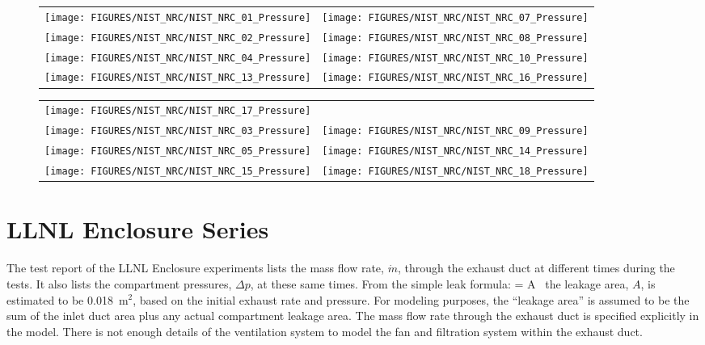 \begin{figure}[p]
\begin{tabular*}{\textwidth}{l@{\extracolsep{\fill}}r}
\texttt{[image: FIGURES/NIST\_NRC/NIST\_NRC\_01\_Pressure]} &
\texttt{[image: FIGURES/NIST\_NRC/NIST\_NRC\_07\_Pressure]} \\
\texttt{[image: FIGURES/NIST\_NRC/NIST\_NRC\_02\_Pressure]} &
\texttt{[image: FIGURES/NIST\_NRC/NIST\_NRC\_08\_Pressure]} \\
\texttt{[image: FIGURES/NIST\_NRC/NIST\_NRC\_04\_Pressure]} &
\texttt{[image: FIGURES/NIST\_NRC/NIST\_NRC\_10\_Pressure]} \\
\texttt{[image: FIGURES/NIST\_NRC/NIST\_NRC\_13\_Pressure]} &
\texttt{[image: FIGURES/NIST\_NRC/NIST\_NRC\_16\_Pressure]}
\end{tabular*}
\label{NIST_NRC_Pressure_Closed}
\end{figure}

\begin{figure}[p]
\begin{tabular*}{\textwidth}{l@{\extracolsep{\fill}}r}
\texttt{[image: FIGURES/NIST\_NRC/NIST\_NRC\_17\_Pressure]} &
   \\
\texttt{[image: FIGURES/NIST\_NRC/NIST\_NRC\_03\_Pressure]} &
\texttt{[image: FIGURES/NIST\_NRC/NIST\_NRC\_09\_Pressure]} \\
\texttt{[image: FIGURES/NIST\_NRC/NIST\_NRC\_05\_Pressure]} &
\texttt{[image: FIGURES/NIST\_NRC/NIST\_NRC\_14\_Pressure]} \\
\texttt{[image: FIGURES/NIST\_NRC/NIST\_NRC\_15\_Pressure]} &
\texttt{[image: FIGURES/NIST\_NRC/NIST\_NRC\_18\_Pressure]}
\end{tabular*}
\label{NIST_NRC_Pressure_Open}
\end{figure}

\clearpage

\section{LLNL Enclosure Series}

The test report of the LLNL Enclosure experiments lists the mass flow rate, $\dot{m}$, through the exhaust duct at different times
during the tests. It also lists the compartment pressures, $\Delta p$, at these same times. From the simple leak formula:
\be {} = A \,  \ee
the leakage area, $A$, is estimated to be 0.018~m$^2$, based on the initial exhaust rate and pressure.
For modeling purposes, the ``leakage area'' is assumed to be the sum of the
inlet duct area plus any actual compartment leakage area. The mass flow rate through the exhaust duct is specified explicitly in
the model. There is not enough details of the ventilation system to model the fan and filtration system within the exhaust duct.

